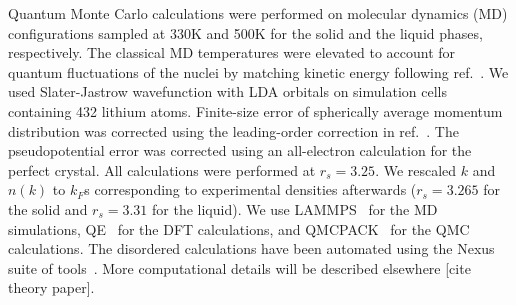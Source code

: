 \documentclass[twocolumn,showpacs,showkeys,fleqn,prl,superscriptaddress]{revtex4}%
\begin{document}
\vspace{10mm}

Quantum Monte Carlo calculations were performed on molecular dynamics (MD) configurations sampled at 330K and 500K for the solid and the liquid phases, respectively. The classical MD temperatures were elevated to account for quantum fluctuations of the nuclei by matching kinetic energy following ref.~\cite{filippi98}. We used Slater-Jastrow wavefunction with LDA orbitals on simulation cells containing 432 lithium atoms. Finite-size error of spherically average momentum distribution was corrected using the leading-order correction in ref.~\cite{holz09}. The pseudopotential error was corrected using an all-electron calculation for the perfect crystal. All calculations were performed at $r_s=3.25$. We rescaled $k$ and $n(k)$ to $k_F$s corresponding to experimental densities afterwards ($r_s=3.265$ for the solid and $r_s=3.31$ for the liquid). We use LAMMPS~\cite{Plimpton1993} for the MD simulations, QE~\cite{Giannozzi2009,Enkovaara2017} for the DFT calculations, and QMCPACK~\cite{Kim2018} for the QMC calculations. The disordered calculations have been automated using the Nexus suite of tools~\cite{Krogel2016}.
More computational details will be described elsewhere [cite theory paper].

\vspace{10mm}
\end{document}
